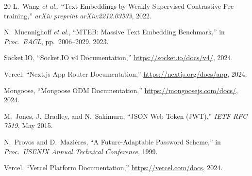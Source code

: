 \documentclass[conference]{IEEEtran}
\begin{document}
\begin{thebibliography}{20}
L.\ Wang \textit{et al.}, ``Text Embeddings by Weakly-Supervised Contrastive Pre-training,'' \textit{arXiv preprint arXiv:2212.03533}, 2022.

N.\ Muennighoff \textit{et al.}, ``MTEB: Massive Text Embedding Benchmark,'' in \textit{Proc.\ EACL}, pp.\ 2006--2029, 2023.

Socket.IO, ``Socket.IO v4 Documentation,'' \url{https://socket.io/docs/v4/}, 2024.

Vercel, ``Next.js App Router Documentation,'' \url{https://nextjs.org/docs/app}, 2024.

Mongoose, ``Mongoose ODM Documentation,'' \url{https://mongoosejs.com/docs/}, 2024.

M.\ Jones, J.\ Bradley, and N.\ Sakimura, ``JSON Web Token (JWT),'' \textit{IETF RFC 7519}, May 2015.

N.\ Provos and D.\ Mazi\`{e}res, ``A Future-Adaptable Password Scheme,'' in \textit{Proc.\ USENIX Annual Technical Conference}, 1999.

Vercel, ``Vercel Platform Documentation,'' \url{https://vercel.com/docs}, 2024.

\end{thebibliography}
\end{document}
